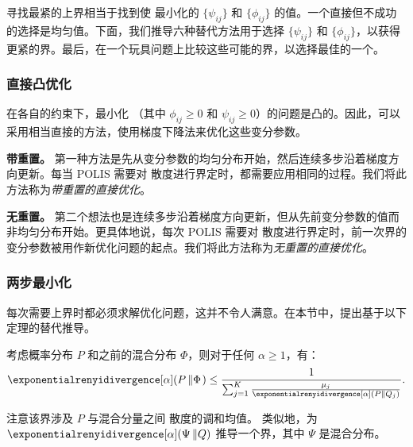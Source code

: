 寻找最紧的上界相当于找到使  最小化的 $\{\psi_{ij}\}$ 和 $\{\phi_{ij}\}$ 的值。一个直接但不成功的选择是均匀值。下面，我们推导六种替代方法用于选择 $\{\psi_{ij}\}$ 和 $\{\phi_{ij}\}$，以获得更紧的界。最后，在一个玩具问题上比较这些可能的界，以选择最佳的一个。



\subsubsection{直接凸优化}
在各自的约束下，最小化 （其中 $\phi_{ij}\geq 0$ 和 $\psi_{ij}\geq 0$）的问题是凸的。因此，可以采用相当直接的方法，使用梯度下降法来优化这些变分参数。

\textbf{带重置。}
第一种方法是先从变分参数的均匀分布开始，然后连续多步沿着梯度方向更新。每当 POLIS 需要对 \Renyi 散度进行界定时，都需要应用相同的过程。我们将此方法称为\emph{带重置的直接优化}。

\textbf{无重置。}
第二个想法也是连续多步沿着梯度方向更新，但从先前变分参数的值而非均匀分布开始。更具体地说，每次 POLIS 需要对 \Renyi 散度进行界定时，前一次界的变分参数被用作新优化问题的起点。我们将此方法称为\emph{无重置的直接优化}。


\subsubsection{两步最小化}
每次需要上界时都必须求解优化问题，这并不令人满意。在本节中，提出基于以下定理的替代推导。

\begin{thm}
\label{th:mix_phi}
    考虑概率分布 $P$ 和之前的混合分布 $\Phi$，则对于任何 $\alpha\geq1$，有：
    \begin{align*}
        \exponentialrenyidivergence[\alpha](P\left\Vert\Phi\right.) \leq     \frac{1}{\sum_{j=1}^K\frac{\mu_j}{\exponentialrenyidivergence[\alpha]( P \Vert Q_j)}}.
    \end{align*}
\end{thm}

注意该界涉及 $P$ 与混合分量之间 \Renyi 散度的调和均值。
类似地，为 $\exponentialrenyidivergence[\alpha](\Psi\left\Vert Q\right)$ 推导一个界，其中 $\Psi$ 是混合分布。

